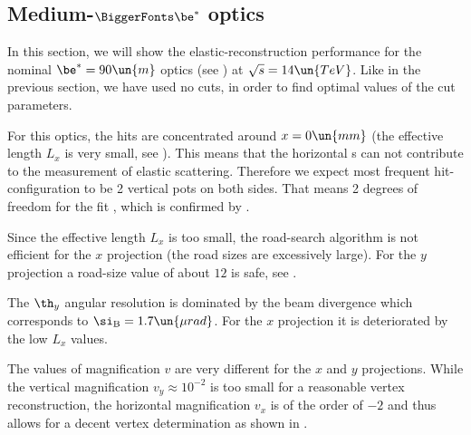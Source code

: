 

\def\OutlineLabel{Medium-beta* optics}
\def\TOCLabel{Medium-$\be^*$ optics}
\subsection[elr 90]{Medium-$\BiggerFonts\mathbf{\be^*}$ optics}

In this section, we will show the elastic-reconstruction performance for the nominal $\be^* = 90\un{m}$ optics (see ) at $\sqrt s = 14\un{TeV}$. Like in the previous section, we have used no cuts, in order to find optimal values of the cut parameters.

For this optics, the hits are concentrated around $x=0\un{mm}$ (the effective length $L_x$ is very small, see ). This means that the horizontal s can not contribute to the measurement of elastic scattering. Therefore we expect most frequent hit-configuration to be 2 vertical pots on both sides. That means 2 degrees of freedom for the fit , which is confirmed by .

Since the effective length $L_x$ is too small, the road-search algorithm is not efficient for the $x$ projection (the road sizes are excessively large). For the $y$ projection a road-size value of about $12$ is safe, see .

\bmfig
{}
\emfig

The $\th_y$ angular resolution is dominated by the beam divergence which corresponds to $\si_{\rm B} = 1.7\un{\mu rad}$. For the $x$ projection it is deteriorated by the low $L_x$ values.

The values of magnification $v$ are very different for the $x$ and $y$ projections. While the vertical magnification $v_y \approx 10^{-2}$ is too small for a reasonable vertex reconstruction, the horizontal magnification $v_x$ is of the order of $-2$ and thus allows for a decent vertex determination as shown in .

\bmfig
{}
\emfig

